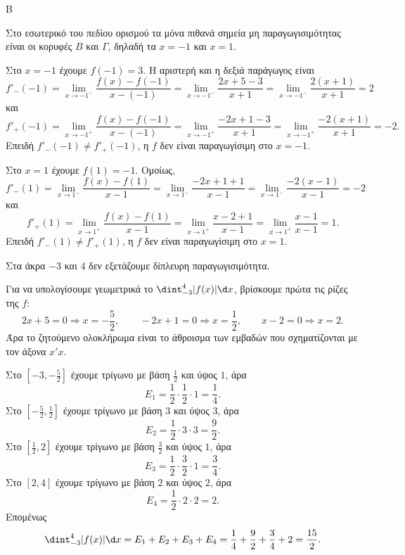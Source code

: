 \begin{thema}{Β}
\begin{erwthma}
\item Στο εσωτερικό του πεδίου ορισμού τα μόνα πιθανά σημεία μη παραγωγισιμότητας είναι οι κορυφές $B$ και $\Gamma$, δηλαδή τα $x=-1$ και $x=1$.

Στο $x=-1$ έχουμε $f(-1)=3$. Η αριστερή και η δεξιά παράγωγος είναι
\[
f'_-(-1)=\lim_{x\to -1^-}\frac{f(x)-f(-1)}{x-(-1)}
=\lim_{x\to -1^-}\frac{2x+5-3}{x+1}
=\lim_{x\to -1^-}\frac{2(x+1)}{x+1}=2
\]
και
\[
f'_+(-1)=\lim_{x\to -1^+}\frac{f(x)-f(-1)}{x-(-1)}
=\lim_{x\to -1^+}\frac{-2x+1-3}{x+1}
=\lim_{x\to -1^+}\frac{-2(x+1)}{x+1}=-2.
\]
Επειδή $f'_-(-1)\neq f'_+(-1)$, η $f$ δεν είναι παραγωγίσιμη στο $x=-1$.

Στο $x=1$ έχουμε $f(1)=-1$. Ομοίως,
\[
f'_-(1)=\lim_{x\to 1^-}\frac{f(x)-f(1)}{x-1}
=\lim_{x\to 1^-}\frac{-2x+1+1}{x-1}
=\lim_{x\to 1^-}\frac{-2(x-1)}{x-1}=-2
\]
και
\[
f'_+(1)=\lim_{x\to 1^+}\frac{f(x)-f(1)}{x-1}
=\lim_{x\to 1^+}\frac{x-2+1}{x-1}
=\lim_{x\to 1^+}\frac{x-1}{x-1}=1.
\]
Επειδή $f'_-(1)\neq f'_+(1)$, η $f$ δεν είναι παραγωγίσιμη στο $x=1$.

Στα άκρα $-3$ και $4$ δεν εξετάζουμε δίπλευρη παραγωγισιμότητα.

\item Για να υπολογίσουμε γεωμετρικά το $\dint_{-3}^{4}|f(x)|\d x$, βρίσκουμε πρώτα τις ρίζες της $f$:
\[
2x+5=0\Rightarrow x=-\frac{5}{2},\qquad
-2x+1=0\Rightarrow x=\frac{1}{2},\qquad
x-2=0\Rightarrow x=2.
\]
Άρα το ζητούμενο ολοκλήρωμα είναι το άθροισμα των εμβαδών που σχηματίζονται με τον άξονα $x'x$.

Στο $\left[-3,-\frac{5}{2}\right]$ έχουμε τρίγωνο με βάση $\frac{1}{2}$ και ύψος $1$, άρα
\[
E_1=\frac{1}{2}\cdot\frac{1}{2}\cdot 1=\frac{1}{4}.
\]
Στο $\left[-\frac{5}{2},\frac{1}{2}\right]$ έχουμε τρίγωνο με βάση $3$ και ύψος $3$, άρα
\[
E_2=\frac{1}{2}\cdot 3\cdot 3=\frac{9}{2}.
\]
Στο $\left[\frac{1}{2},2\right]$ έχουμε τρίγωνο με βάση $\frac{3}{2}$ και ύψος $1$, άρα
\[
E_3=\frac{1}{2}\cdot\frac{3}{2}\cdot 1=\frac{3}{4}.
\]
Στο $[2,4]$ έχουμε τρίγωνο με βάση $2$ και ύψος $2$, άρα
\[
E_4=\frac{1}{2}\cdot 2\cdot 2=2.
\]
Επομένως
\[
\dint_{-3}^{4}|f(x)|\d x
=E_1+E_2+E_3+E_4
=\frac{1}{4}+\frac{9}{2}+\frac{3}{4}+2
=\frac{15}{2}.
\]
\end{erwthma}
\end{thema}

